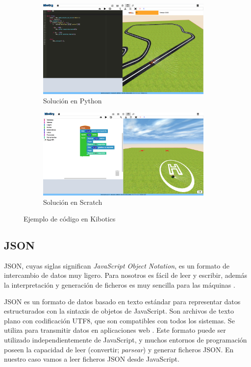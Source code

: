 \begin{figure}[H]
  \begin{subfigure}[b]{1\textwidth}
  \centering
    \includegraphics[width=0.95\textwidth, height=0.4\textwidth]{chapters/images/python.png}
    \caption{Solución en Python}
    \label{fig:f1}
  \end{subfigure}
  \hfill
  \begin{subfigure}[b]{1\textwidth}
  \centering
    \includegraphics[width=0.95\textwidth, height=0.4\textwidth]{chapters/images/scratch2.png}
    \caption{Solución en Scratch}
    \label{fig:f2}
  \end{subfigure}
  \caption{Ejemplo de código en Kibotics }
\end{figure}


\subsection{JSON} JSON, cuyas siglas significan \textit{JavaScript Object Notation}, es un formato de intercambio de datos muy ligero. Para nosotros es fácil de leer y escribir, además la interpretación y generación de ficheros es muy sencilla para las máquinas \cite{json}.

JSON es un formato de datos basado en texto estándar para representar datos estructurados con la sintaxis de objetos de JavaScript. Son archivos de texto plano con codificación UTF8, que son compatibles con todos los sistemas. Se utiliza para transmitir datos en aplicaciones web \cite{json2}. 
Este formato puede ser utilizado independientemente de JavaScript, y muchos entornos de programación poseen la capacidad de leer (convertir; \textit{parsear}) y generar ficheros JSON. En nuestro caso vamos a leer ficheros JSON desde JavaScript.

